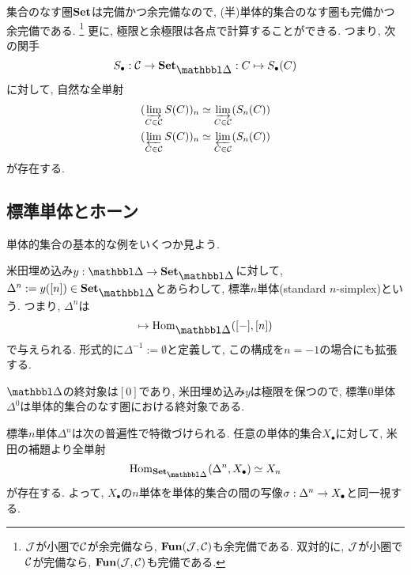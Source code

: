 \documentclass[uplatex, a4paper, 14Q, dvipdfmx]{jsreport}
\begin{document}
\begin{remark}
  集合のなす圏$\mathbf{Set}$は完備かつ余完備なので, (半)単体的集合のなす圏も完備かつ余完備である. 
  \footnote{
    $\mathcal{J}$が小圏で$\mathcal{C}$が余完備なら, $\mathbf{Fun}(\mathcal{J},\mathcal{C})$も余完備である. 
    双対的に, $\mathcal{J}$が小圏で$\mathcal{C}$が完備なら, $\mathbf{Fun}(\mathcal{J},\mathcal{C})$も完備である. 
  }
  更に, 極限と余極限は各点で計算することができる. 
  つまり, 次の関手
  \begin{align*}
    \S: \calC \to \sset: C \mt \S(C)
  \end{align*}
  に対して, 自然な全単射
  \begin{align*}
    (\varinjlim_{C \in \mathcal{C}}S(C))_n \simeq \varinjlim_{C \in \mathcal{C}}(S_n(C)) \\
    (\varprojlim_{C \in \mathcal{C}}S(C))_n \simeq \varprojlim_{C \in \mathcal{C}}(S_n(C))
  \end{align*}
  が存在する. 
\end{remark}

\subsection{標準単体とホーン}

単体的集合の基本的な例をいくつか見よう. 

\begin{cons}
  米田埋め込み$y:\csim \to \sset$に対して, $\Delta^n:=y([n]) \in \sset$とあらわして, 標準$n$単体(standard $n$-simplex)という.
  つまり, $\Delta^n$は
  \begin{align*}
    [-] \mt \Hom_{\csim}([-],[n])
  \end{align*}
  で与えられる. 
  形式的に$\Delta^{-1}:=\emptyset$と定義して, この構成を$n=-1$の場合にも拡張する. 
\end{cons}

\begin{example}
  $\csim$の終対象は$[0]$であり, 米田埋め込み$y$は極限を保つので, 標準$0$単体$\Delta^0$は単体的集合のなす圏における終対象である. 
\end{example}

\begin{remark}
  標準$n$単体$\Delta^n$は次の普遍性で特徴づけられる. 
  任意の単体的集合$X_{\bullet}$に対して, 米田の補題より全単射
  \begin{align*}
    \Hom_{\sset}(\Delta^n,X_{\bullet}) \simeq X_n
  \end{align*}
  が存在する. 
  よって, $X_{\bullet}$の$n$単体を単体的集合の間の写像$\sigma: \Delta^n \to X_{\bullet}$と同一視する. 
\end{remark}
\end{document}
